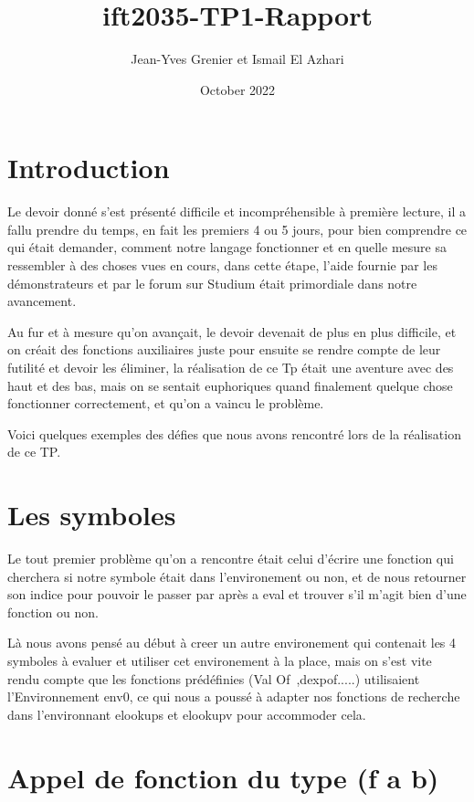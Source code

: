 \documentclass{article}
\title{ift2035-TP1-Rapport}
\author{Jean-Yves Grenier et Ismail El Azhari }
\date{October 2022}
\begin{document}
\maketitle

\section{Introduction}

Le devoir donné s'est présenté difficile et incompréhensible à première lecture, il a fallu prendre du temps, en fait les premiers 4 ou 5 jours, pour bien comprendre ce qui était demander, comment notre langage fonctionner et en quelle mesure sa ressembler à des choses vues en cours, dans cette étape, l'aide fournie par les démonstrateurs et par le forum sur Studium était primordiale dans notre avancement.

Au fur et à mesure qu'on avançait, le devoir devenait de plus en plus difficile, et on créait des fonctions auxiliaires juste pour ensuite se rendre compte de leur futilité et devoir les éliminer, la réalisation de ce Tp était une aventure avec des haut et des bas, mais on se sentait euphoriques quand finalement quelque chose fonctionner correctement, et qu'on a vaincu le problème.

Voici quelques exemples des défies que nous avons rencontré lors de la réalisation de ce TP.

\section{Les symboles}

Le tout premier problème qu'on a rencontre était celui d'écrire une fonction qui cherchera si notre symbole était dans l'environement ou non, et de nous retourner son indice pour pouvoir le passer par après a eval et trouver s'il m'agit bien d'une fonction ou non.

Là nous avons pensé au début à creer un autre environement qui contenait les 4 symboles à evaluer et utiliser cet environement à la place, mais on s'est vite rendu compte que les fonctions prédéfinies (Val Of ,dexpof.....) utilisaient l'Environnement env0, ce qui nous a poussé à adapter nos fonctions de recherche dans l'environnant elookups et elookupv pour accommoder cela.

\section{Appel de fonction du type (f a b)}
\end{document}
